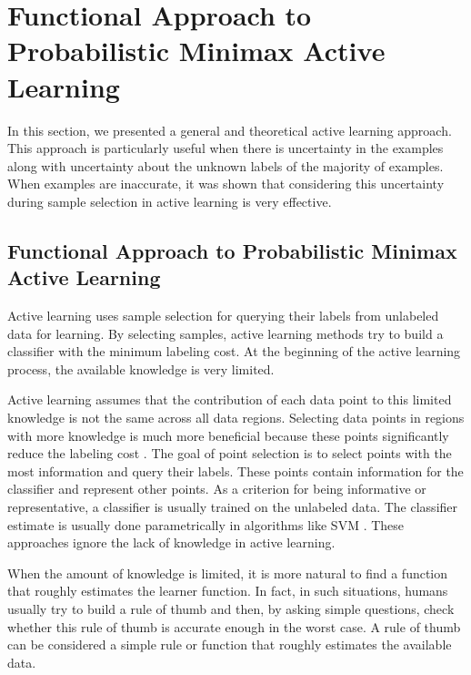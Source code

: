 \documentclass[12pt]{article}
\begin{document}
	\section{Functional Approach to Probabilistic Minimax Active Learning}
	In this section, we presented a general and theoretical active learning approach. This approach is particularly useful when there is uncertainty in the examples along with uncertainty about the unknown labels of the majority of examples. When examples are inaccurate, it was shown that considering this uncertainty during sample selection in active learning is very effective.
	
	\subsection{Functional Approach to Probabilistic Minimax Active Learning}
	Active learning uses sample selection for querying their labels from unlabeled data for learning. By selecting samples, active learning methods try to build a classifier with the minimum labeling cost. At the beginning of the active learning process, the available knowledge is very limited.
	
	Active learning assumes that the contribution of each data point to this limited knowledge is not the same across all data regions. Selecting data points in regions with more knowledge is much more beneficial because these points significantly reduce the labeling cost \cite{freund1997selective, lewis1994heterogeneous}. The goal of point selection is to select points with the most information and query their labels. These points contain information for the classifier and represent other points. As a criterion for being informative or representative, a classifier is usually trained on the unlabeled data. The classifier estimate is usually done parametrically in algorithms like SVM \cite{schohn2000active, tong2001support}. These approaches ignore the lack of knowledge in active learning.
	
	When the amount of knowledge is limited, it is more natural to find a function that roughly estimates the learner function. In fact, in such situations, humans usually try to build a rule of thumb and then, by asking simple questions, check whether this rule of thumb is accurate enough in the worst case. A rule of thumb can be considered a simple rule or function that roughly estimates the available data.
	
\end{document}
